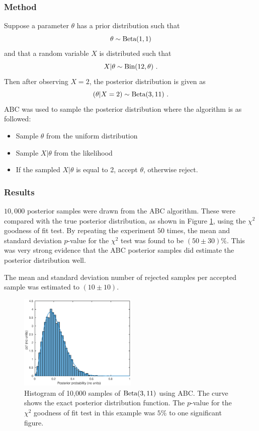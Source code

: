 \documentclass[a4paper,10pt]{article}
\begin{document}
\subsubsection{Method}
Suppose a parameter $\theta$ has a prior distribution such that
\begin{equation}
\theta\sim\textup{Beta}(1,1)
\end{equation}
and that a random variable $X$ is distributed such that
\begin{equation}
X|\theta\sim\textup{Bin}(12,\theta) \ .
\end{equation}
Then after observing $X=2$, the posterior distribution is given as
\begin{equation}
(\theta|X=2)\sim\textup{Beta}(3,11) \ .
\end{equation}
ABC was used to sample the posterior distribution where the algorithm is as followed:
\begin{itemize}
  \item Sample $\theta$ from the uniform distribution
  \item Sample $X|\theta$ from the likelihood
  \item If the sampled $X|\theta$ is equal to 2, accept $\theta$, otherwise reject.
\end{itemize}

\subsubsection{Results}
$10,000$ posterior samples were drawn from the ABC algorithm. These were compared with the true posterior distribution, as shown in Figure \ref{binomial}, using the $\chi^2$ goodness of fit test.  By repeating the experiment $50$ times, the mean and standard deviation $p$-value for the $\chi^2$ test was found to be $(50\pm30)\%$. This was very strong evidence that the ABC posterior samples did estimate the posterior distribution well.

The mean and standard deviation number of rejected samples per accepted sample was estimated to $(10\pm10)$.

\begin{figure}
\centering
\includegraphics[width=0.5\textwidth]{binomial_ABC0528.eps}
\caption{Histogram of 10,000 samples of $\textup{Beta}(3,11)$ using ABC. The curve shows the exact posterior distribution function. The $p$-value for the $\chi^2$ goodness of fit test in this example was $5\%$ to one significant figure.}
\label{binomial}
\end{figure}
\end{document}

